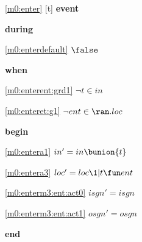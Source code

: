 \noindent \ref{m0:enter} [t] \textbf{event}
\begin{block}
\item \textbf{during}
\begin{block}
\item[ \eqref{m0:enterdefault} ]$\false$ %
\end{block}
\item \textbf{when}
\begin{block}
\item[ \eqref{m0:enterent:grd1} ]$\neg t \in in $ %
\item[ \eqref{m0:enteret:g1} ]$\neg ent \in \ran.loc $ %
\end{block}
\item \textbf{begin}
\begin{block}
\item[ \eqref{m0:entera1} ]$in' = in \bunion \{ t \} $ %
\item[ \eqref{m0:entera3} ]$loc' = loc \1| t \fun ent $ %
\item[ \eqref{m0:enterm3:ent:act0} ]$isgn' = isgn$ %
\item[ \eqref{m0:enterm3:ent:act1} ]$osgn' = osgn$ %
\end{block}
\item \textbf{end} \\
\end{block}
